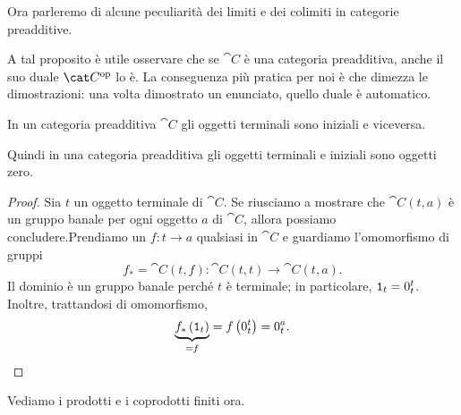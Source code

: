 Ora parleremo di alcune peculiarità dei limiti e dei colimiti in categorie
preadditive.

\begin{remark}
A tal proposito è utile osservare che se \(\cat C\) è
una categoria preadditiva, anche il suo duale \(\opcat C\) lo è. La
conseguenza più pratica per noi è che dimezza le dimostrazioni: una
volta dimostrato un enunciato, quello duale è automatico.
\end{remark}

\begin{proposition}
  In un categoria preadditiva \(\cat C\) gli oggetti terminali sono
  iniziali e viceversa.
\end{proposition}

Quindi in una categoria preadditiva gli oggetti terminali e iniziali
sono oggetti zero.

\begin{proof}
  Sia \(t\) un oggetto terminale di \(\cat C\). Se riusciamo a
  mostrare che \(\cat C(t, a)\) è un gruppo banale per ogni oggetto
  \(a\) di \(\cat C\), allora possiamo concludere.\newline Prendiamo un
  \(f : t \to a\) qualsiasi in \(\cat C\) e guardiamo l'omomorfismo di
  gruppi
  \[
    f_\ast = \cat C(t, f) : \cat C(t, t) \to \cat C(t, a) .
  \]
  Il dominio è un gruppo banale perché \(t\) è terminale; in
  particolare, \(\mathtt 1_t = 0_t^t\). Inoltre, trattandosi di omomorfismo,
  \[
    \underbrace{f_\ast \left(\id_t\right)}_{= f} = f\left(0_t^t\right) =
    0_t^a . \qedhere
  \]
\end{proof}

Vediamo i prodotti e i coprodotti finiti ora.

